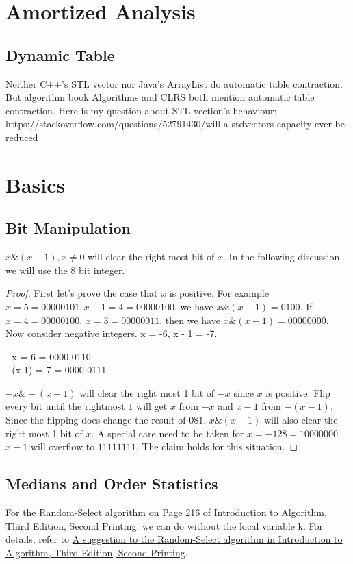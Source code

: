 \documentclass{book}
\begin{document}
\chapter{Amortized Analysis}
\section{Dynamic Table}
Neither C++'s STL vector nor Java's ArrayList do automatic table contraction. But
algorithm book Algorithms and CLRS both mention automatic table contraction. Here is my
question about STL vection's hehaviour: https://stackoverflow.com/questions/52791430/will-a-stdvectors-capacity-ever-be-reduced

\chapter{Basics}

\section{Bit Manipulation}

$x \& (x-1), x \ne 0$ will clear the right most bit of $x$. In the following
discussion, we will use the 8 bit integer.

\begin{proof}
  First let's prove the case that $x$ is positive. For example $x = 5 =
0000 0101, x - 1 = 4 = 0000 0100$, we have $x \& (x-1) = 0100$. If $x = 4 = 0000
     0100$, $x = 3 = 0000 0011$, then we have $x \& (x-1) = 0000 0000$. Now consider negative integers. x =
-6, x - 1 = -7.

- x     = 6 = 0000 0110 \\
- (x-1) = 7 = 0000 0111

$-x \& -(x-1)$ will clear the right most 1 bit of $-x$ since $x$ is positive. Flip every bit until the
rightmost $1$ will get $x$ from $-x$ and $x-1$ from $-(x-1)$. Since the flipping
does change the result of $0 \$ 1$. $x \& (x-1)$ will also clear the right most
1 bit of $x$. A special care need to be taken for $ x = -128 = 1000 0000$. $x -
  1$ will overflow to $1111 1111$. The claim holds for this situation.
\end{proof}

\section{Medians and Order Statistics}

For the Random-Select algorithm on Page 216 of Introduction to Algorithm, Third
Edition, Second Printing, we can do without the local variable k. For details,
refer to
\href{https://mail.google.com/mail/u/0/#inbox/QgrcJHsTkLLCjNWbLPRJMmqDBRSjdplRtBl}{
A suggestion to the Random-Select algorithm in Introduction to Algorithm, Third
Edition, Second Printing}.
\end{document}
